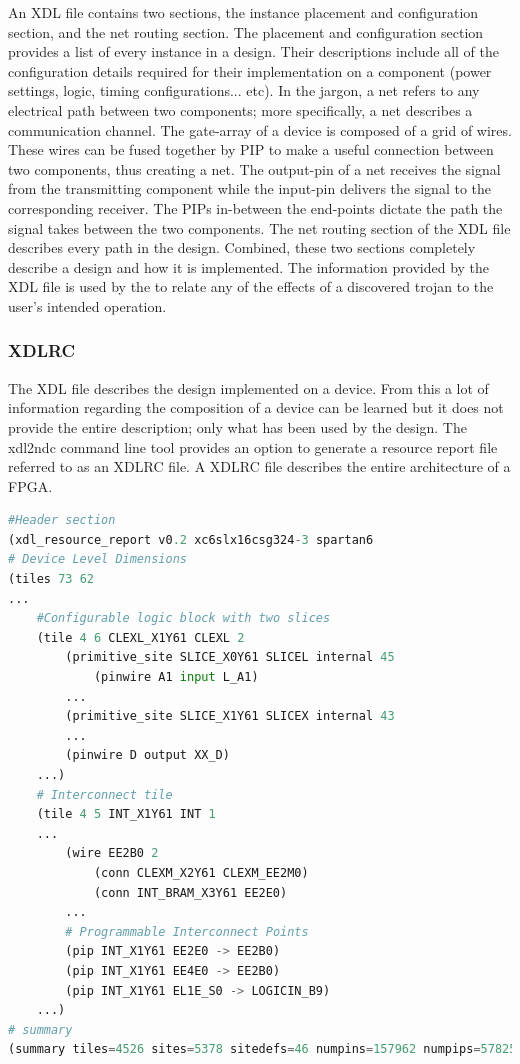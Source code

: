 An \acrshort{XDL} file contains two sections, the instance placement and configuration section, and the net routing section. 
The placement and configuration section provides a list of every instance in a design. 
Their descriptions include all of the configuration details required for their implementation on a component (power settings, logic, timing configurations... etc).
In the \Xilinx jargon, a net refers to any electrical path between two components; more specifically, a net describes a communication channel.
The gate-array of a \Xilinx device is composed of a grid of wires.
These wires can be fused together by \acrfull{PIP} to make a useful connection between two components, thus creating a net.
The output-pin of a net receives the signal from the transmitting component while the input-pin delivers the signal to the corresponding receiver.
The \acrshort{PIP}s in-between the end-points dictate the path the signal takes between the two components.
The net routing section of the \acrshort{XDL} file describes every path in the design.
Combined, these two sections completely describe a design and how it is implemented.
The information provided by the \acrshort{XDL} file is used by the \NameNoPeriod to relate any of the effects of a discovered trojan to the user's intended operation. 
\subsubsection{XDLRC} \label{sec:XDLRC}
The \acrshort{XDL} file describes the design implemented on a device.
From this a lot of information regarding the composition of a \Xilinx device can be learned but it does not provide the entire description; only what has been used by the design.
The \gls{xdl2ndc} command line tool provides an option to generate a resource report file referred to as an XDLRC file. 
A XDLRC file describes the entire architecture of a \Xilinx \acrshort{FPGA}.

\ConditionSize
\begin{lstlisting}[label={lst:xdlrc}, language=Python, caption={A hierarchical XDLRC resource description of a Spartan 6 FPGA consisting of a header, a tile section, and a trailing device summary~\cite{xdlTutorial}}]
#Header section
(xdl_resource_report v0.2 xc6slx16csg324-3 spartan6
# Device Level Dimensions
(tiles 73 62
...
	#Configurable logic block with two slices
	(tile 4 6 CLEXL_X1Y61 CLEXL 2
		(primitive_site SLICE_X0Y61 SLICEL internal 45
			(pinwire A1 input L_A1)
		...
		(primitive_site SLICE_X1Y61 SLICEX internal 43
		...
		(pinwire D output XX_D)
	...)
	# Interconnect tile
	(tile 4 5 INT_X1Y61 INT 1
	...
		(wire EE2B0 2
			(conn CLEXM_X2Y61 CLEXM_EE2M0)
			(conn INT_BRAM_X3Y61 EE2E0)
		...
		# Programmable Interconnect Points
		(pip INT_X1Y61 EE2E0 -> EE2B0)
		(pip INT_X1Y61 EE4E0 -> EE2B0)
		(pip INT_X1Y61 EL1E_S0 -> LOGICIN_B9)
	...)
# summary
(summary tiles=4526 sites=5378 sitedefs=46 numpins=157962 numpips=5782505))
\end{lstlisting}
\normalsize

